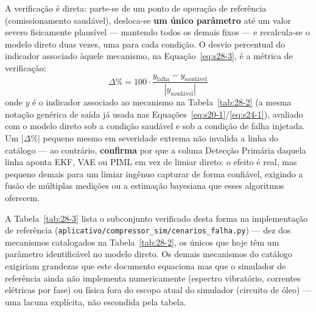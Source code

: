 \documentclass[12pt,a4paper]{article}
\numberwithin{equation}{section}
\numberwithin{table}{section}
\numberwithin{figure}{section}
\begin{document}
{A verificação é direta: parte-se de um ponto de operação de referência (comissionamento saudável), desloca-se \textbf{um único parâmetro} até um valor severo fisicamente plausível — mantendo todos os demais fixos — e recalcula-se o modelo direto duas vezes, uma para cada condição. O desvio percentual do indicador associado àquele mecanismo, na Equação~\eqref{eq:s28-3}, é a métrica de verificação:
\begin{equation}\label{eq:s28-3}
\Delta\% = 100 \cdot \frac{y_{\text{falha}} - y_{\text{saudável}}}{|y_{\text{saudável}}|}
\end{equation}
onde $y$ é o indicador associado ao mecanismo na Tabela~\ref{tab:28-2} (a mesma notação genérica de saída já usada nas Equações~\eqref{eq:s20-1}/\eqref{eq:s24-1}), avaliado com o modelo direto sob a condição saudável e sob a condição de falha injetada. Um $|\Delta\%|$ pequeno mesmo em severidade extrema não invalida a linha do catálogo — ao contrário, \textbf{confirma} por que a coluna Detecção Primária daquela linha aponta EKF, VAE ou PIML em vez de limiar direto: o efeito é real, mas pequeno demais para um limiar ingênuo capturar de forma confiável, exigindo a fusão de múltiplas medições ou a estimação bayesiana que esses algoritmos oferecem.

A Tabela~\ref{tab:28-3} lista o subconjunto verificado desta forma na implementação de referência (\texttt{aplicativo/compressor\_sim/cenarios\_falha.py}) — dez dos mecanismos catalogados na Tabela~\ref{tab:28-2}, os únicos que hoje têm um parâmetro identificável no modelo direto. Os demais mecanismos do catálogo exigiriam grandezas que este documento equaciona mas que o simulador de referência ainda não implementa numericamente (espectro vibratório, correntes elétricas por fase) ou física fora do escopo atual do simulador (circuito de óleo) — uma lacuna explícita, não escondida pela tabela.

}
\end{document}
